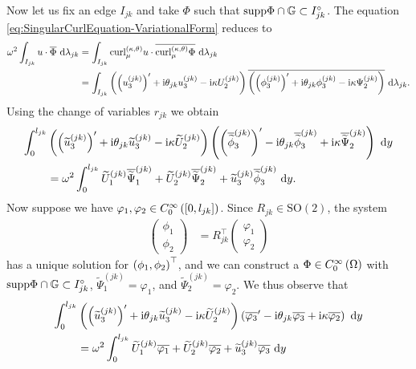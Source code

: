 Now let us fix an edge $I_{jk}$ and take $\Phi$ such that $\mathrm{supp}\Phi\cap\mathbb{G}\subset I_{jk}^{\circ}$.
The equation \eqref{eq:SingularCurlEquation-VariationalForm} reduces to
\begin{align*}
	\omega^2 \int_{I_{jk}} u\cdot\overline{\Phi}  \ \mathrm{d}\lambda_{jk}
	&= \int_{I_{jk}} \mathrm{curl}_{\mu}^{\left( \kappa, \theta \right)}u\cdot\overline{\mathrm{curl}_{\mu}^{\left( \kappa, \theta \right)}\Phi}  \ \mathrm{d}\lambda_{jk} \\
	&= \int_{I_{jk}} \left(  \left( u_3^{(jk)} \right)' + \mathrm{i}\theta_{jk} u_3^{(jk)} - \mathrm{i}\kappa U_2^{(jk)}  \right)\overline{\left(  \left( \phi_3^{(jk)} \right)' + \mathrm{i}\theta_{jk} \phi_3^{(jk)} - \mathrm{i}\kappa \Psi_2^{(jk)}  \right)}  \ \mathrm{d}\lambda_{jk}.
\end{align*}
Using the change of variables $r_{jk}$ we obtain
\begin{align*}
	\int_0^{l_{jk}} & \left(  \left( \widetilde{u}_3^{(jk)} \right)' + \mathrm{i}\theta_{jk} \widetilde{u}_3^{(jk)} - \mathrm{i}\kappa \widetilde{U}_2^{(jk)}  \right) \left(  \left( \overline{\widetilde{\phi}}_3^{(jk)} \right)' - \mathrm{i}\theta_{jk} \overline{\widetilde{\phi}}_3^{(jk)} + \mathrm{i}\kappa \overline{\widetilde{\Psi}}_2^{(jk)}  \right) \ \mathrm{d} y \\
	&= \omega^2 \int_0^{l_{jk}} \widetilde{U}_1^{(jk)}\overline{\widetilde{\Psi}}_1^{(jk)} + \widetilde{U}_2^{(jk)}\overline{\widetilde{\Psi}}_2^{(jk)} + \widetilde{u}_3^{(jk)}\overline{\widetilde{\phi}}_3^{(jk)} \ \mathrm{d} y.
\end{align*}
Now suppose we have $\varphi_1,\varphi_2\in C^{\infty}_{0}\left( \left[ 0,l_{jk} \right] \right)$.
Since $R_{jk}\in\mathrm{SO}(2)$, the system
\begin{align*}
	\begin{pmatrix} \phi_1 \\ \phi_2 \end{pmatrix} &= R_{jk}^\top \begin{pmatrix} \varphi_1 \\ \varphi_2 \end{pmatrix}
\end{align*}
has a unique solution for $\left( \phi_1,\phi_2 \right)^\top$, and we can construct a $\Phi\in C^{\infty}_{0}\left( \Omega \right)$ with $\mathrm{supp}\Phi\cap\mathbb{G}\subset I_{jk}^{\circ}$, $\widetilde{\Psi}_1^{(jk)}=\varphi_1$, and $\widetilde{\Psi}_2^{(jk)}=\varphi_2$.
We thus observe that
\begin{align*}
	\int_0^{l_{jk}} & \left(  \left( \widetilde{u}_3^{(jk)} \right)' + \mathrm{i}\theta_{jk} \widetilde{u}_3^{(jk)} - \mathrm{i}\kappa \widetilde{U}_2^{(jk)}  \right) \left(  \overline{\varphi_3}' - \mathrm{i}\theta_{jk} \overline{\varphi_3} + \mathrm{i}\kappa \overline{\varphi_2}  \right) \ \mathrm{d} y \\
	&= \omega^2 \int_0^{l_{jk}} \widetilde{U}_1^{(jk)}\overline{\varphi_1} + \widetilde{U}_2^{(jk)}\overline{\varphi_2} + \widetilde{u}_3^{(jk)}\overline{\varphi_3} \ \mathrm{d} y
\end{align*}
